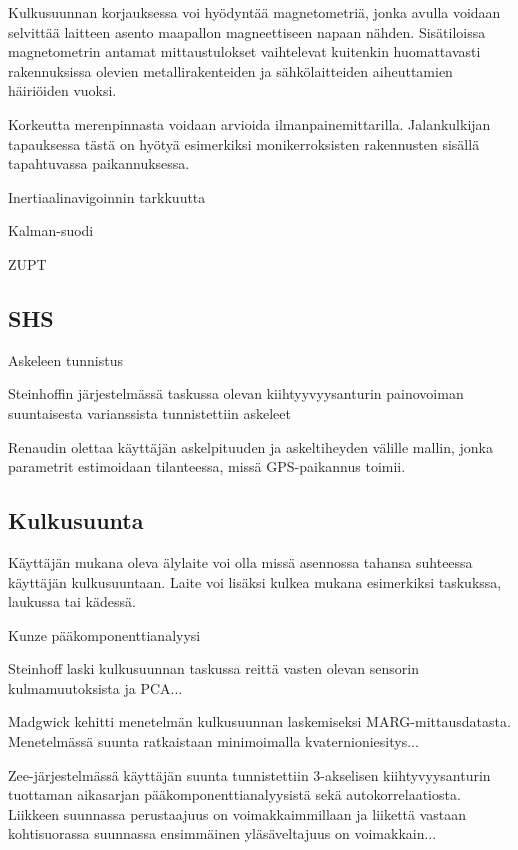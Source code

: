 Kulkusuunnan korjauksessa voi hyödyntää magnetometriä, jonka avulla voidaan
selvittää laitteen asento maapallon magneettiseen napaan nähden. Sisätiloissa
magnetometrin antamat mittaustulokset vaihtelevat kuitenkin huomattavasti
rakennuksissa olevien metallirakenteiden ja sähkölaitteiden aiheuttamien
häiriöiden vuoksi.

Korkeutta merenpinnasta voidaan arvioida ilmanpainemittarilla. Jalankulkijan
tapauksessa tästä on hyötyä esimerkiksi monikerroksisten rakennusten
sisällä tapahtuvassa paikannuksessa.




Inertiaalinavigoinnin tarkkuutta 




Kalman-suodi

ZUPT

\subsection{SHS}

Askeleen tunnistus

Steinhoffin järjestelmässä \cite{steinhoff2010dead} taskussa olevan
kiihtyyvyysanturin painovoiman suuntaisesta varianssista tunnistettiin
askeleet

Renaudin olettaa käyttäjän askelpituuden ja askeltiheyden välille mallin,
jonka parametrit estimoidaan tilanteessa, missä GPS-paikannus toimii.

\subsection{Kulkusuunta}

Käyttäjän mukana oleva älylaite voi olla missä asennossa tahansa suhteessa
käyttäjän kulkusuuntaan. Laite voi lisäksi kulkea mukana esimerkiksi
taskukssa, laukussa tai kädessä.

Kunze  pääkomponenttianalyysi

Steinhoff laski kulkusuunnan taskussa reittä vasten olevan sensorin
kulmamuutoksista ja PCA...

Madgwick \cite{madgwick2011estimation} kehitti menetelmän kulkusuunnan
laskemiseksi MARG-mittausdatasta.
Menetelmässä suunta ratkaistaan minimoimalla kvaternioniesitys...

Zee-järjestelmässä \cite{rai2012zee} käyttäjän suunta tunnistettiin 3-akselisen
kiihtyvyysanturin tuottaman aikasarjan pääkomponenttianalyysistä sekä
autokorrelaatiosta. Liikkeen suunnassa perustaajuus on voimakkaimmillaan
ja liikettä vastaan kohtisuorassa suunnassa ensimmäinen yläsäveltajuus
on voimakkain...

